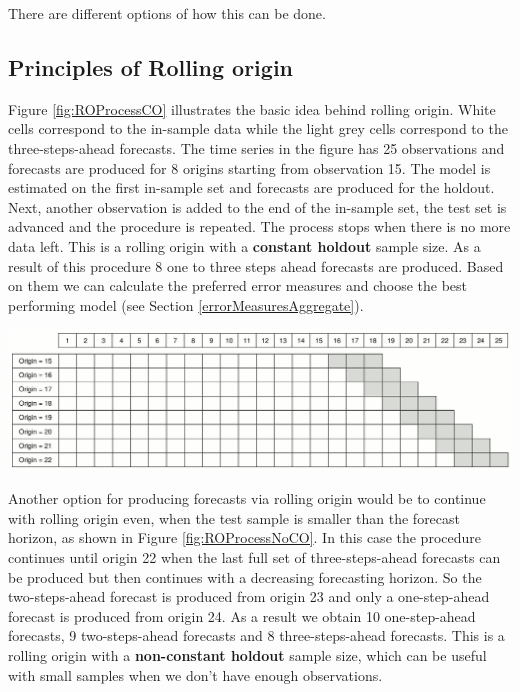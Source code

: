 \documentclass[
]{book}
\theoremstyle{definition}
\theoremstyle{definition}
\theoremstyle{definition}
\theoremstyle{definition}
\theoremstyle{remark}
\begin{document}
There are different options of how this can be done.

\hypertarget{principles-of-rolling-origin}{%
\subsection{Principles of Rolling origin}\label{principles-of-rolling-origin}}

Figure \ref{fig:ROProcessCO} \citep{Svetunkov2017} illustrates the basic idea behind rolling origin. White cells correspond to the in-sample data while the light grey cells correspond to the three-steps-ahead forecasts. The time series in the figure has 25 observations and forecasts are produced for 8 origins starting from observation 15. The model is estimated on the first in-sample set and forecasts are produced for the holdout. Next, another observation is added to the end of the in-sample set, the test set is advanced and the procedure is repeated. The process stops when there is no more data left. This is a rolling origin with a \textbf{constant holdout} sample size. As a result of this procedure 8 one to three steps ahead forecasts are produced. Based on them we can calculate the preferred error measures and choose the best performing model (see Section \ref{errorMeasuresAggregate}).

\includegraphics{./images/03-ROProcessCO.jpg}

Another option for producing forecasts via rolling origin would be to continue with rolling origin even, when the test sample is smaller than the forecast horizon, as shown in Figure \ref{fig:ROProcessNoCO}. In this case the procedure continues until origin 22 when the last full set of three-steps-ahead forecasts can be produced but then continues with a decreasing forecasting horizon. So the two-steps-ahead forecast is produced from origin 23 and only a one-step-ahead forecast is produced from origin 24. As a result we obtain 10 one-step-ahead forecasts, 9 two-steps-ahead forecasts and 8 three-steps-ahead forecasts. This is a rolling origin with a \textbf{non-constant holdout} sample size, which can be useful with small samples when we don't have enough observations.
\end{document}
